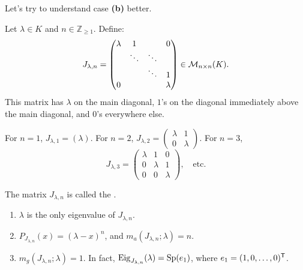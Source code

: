 Let's try to understand case \textbf{(b)} better.

\begin{definition}
\label{def:jordan_matrix}
Let $\lambda \in K$ and $n \in \mathbb{Z}_{\ge 1}$. Define:
\[
J_{\lambda, n} = \begin{pmatrix} \lambda & 1 & & 0 \\ & \ddots & \ddots & \\ & & \ddots & 1 \\ 0 & & & \lambda \end{pmatrix} \in \mathcal{M}_{n \times n}(K).
\]
This matrix has $\lambda$ on the main diagonal, $1$'s on the diagonal immediately above the main diagonal, and $0$'s everywhere else.

For $n=1$, $J_{\lambda, 1} = (\lambda)$. For $n=2$, $J_{\lambda, 2} = \left(\begin{smallmatrix} \lambda & 1 \\ 0 & \lambda \end{smallmatrix}\right)$. For $n=3$,
\[
J_{\lambda, 3} = \begin{pmatrix} \lambda & 1 & 0 \\ 0 & \lambda & 1 \\ 0 & 0 & \lambda \end{pmatrix}, \quad \text{etc.}
\]

The matrix $J_{\lambda, n}$ is called the .
\end{definition}

\begin{lemma}
\label{lem:properties_jordan_matrix}
\leavevmode
\begin{enumerate}[label=\textbf{(\alph*)}]
    \item $\lambda$ is the only eigenvalue of $J_{\lambda, n}$.
    \item $P_{J_{\lambda, n}}(x) = (\lambda - x)^n$, and $m_a(J_{\lambda, n}; \lambda) = n$.
    \item $m_g(J_{\lambda, n}; \lambda) = 1$. In fact, $\operatorname{Eig}_{J_{\lambda, n}}(\lambda) = \operatorname{Sp}(e_1)$, where $e_1 = (1, 0, \dots, 0)^{\mathsf{T}}$.
\end{enumerate}
\end{lemma}

